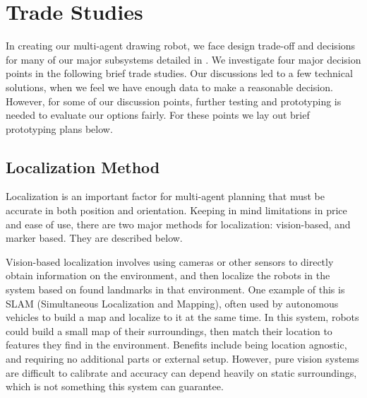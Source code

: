 
\section{Trade Studies}
\label{sec:trade_studies}

In creating our multi-agent drawing robot, we face design trade-off and decisions for many of our major subsystems detailed in . We investigate four major decision points in the following brief trade studies. Our discussions led to a few technical solutions, when we feel we have enough data to make a reasonable decision. However, for some of our discussion points, further testing and prototyping is needed to evaluate our options fairly. For these points we lay out brief prototyping plans below. 

\subsection{Localization Method}
\label{sec:trade_localization}
Localization is an important factor for multi-agent planning that must be accurate in both position and orientation. Keeping in mind limitations in price and ease of use, there are two major methods for localization: vision-based, and marker based. They are described below.

Vision-based localization involves using cameras or other sensors to directly obtain information on the environment, and then localize the robots in the system based on found landmarks in that environment. One example of this is SLAM (Simultaneous Localization and Mapping), often used by autonomous vehicles to build a map and localize to it at the same time. In this system, robots could build a small map of their surroundings, then match their location to features they find in the environment. Benefits include being location agnostic, and requiring no additional parts or external setup. However, pure vision systems are difficult to calibrate and accuracy can depend heavily on static surroundings, which is not something this system can guarantee.

